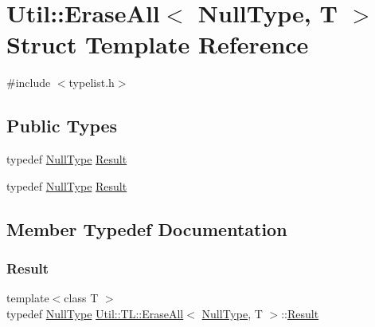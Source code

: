 \hypertarget{structUtil_1_1TL_1_1EraseAll_3_01NullType_00_01T_01_4}{}\section{Util\+:\+:Erase\+All$<$ Null\+Type, T $>$ Struct Template Reference}
\label{structUtil_1_1TL_1_1EraseAll_3_01NullType_00_01T_01_4}


{\ttfamily \#include $<$typelist.\+h$>$}

\subsection*{Public Types}
\begin{DoxyCompactItemize}
\item 
typedef \mbox{\hyperlink{classUtil_1_1NullType}{Null\+Type}} \mbox{\hyperlink{structUtil_1_1TL_1_1EraseAll_3_01NullType_00_01T_01_4_ae8985ba005cb92b28012106353aa56be}{Result}}
\item 
typedef \mbox{\hyperlink{classUtil_1_1NullType}{Null\+Type}} \mbox{\hyperlink{structUtil_1_1TL_1_1EraseAll_3_01NullType_00_01T_01_4_ae8985ba005cb92b28012106353aa56be}{Result}}
\end{DoxyCompactItemize}


\subsection{Member Typedef Documentation}
\mbox{\label{structUtil_1_1TL_1_1EraseAll_3_01NullType_00_01T_01_4_ae8985ba005cb92b28012106353aa56be}} 
\subsubsection{\texorpdfstring{Result}{Result}\hspace{0.1cm}{\footnotesize\ttfamily [1/2]}}
{\footnotesize\ttfamily template$<$class T $>$ \\
typedef \mbox{\hyperlink{classUtil_1_1NullType}{Null\+Type}} \mbox{\hyperlink{structUtil_1_1TL_1_1EraseAll}{Util\+::\+T\+L\+::\+Erase\+All}}$<$ \mbox{\hyperlink{classUtil_1_1NullType}{Null\+Type}}, T $>$\+::\mbox{\hyperlink{structUtil_1_1TL_1_1EraseAll_3_01NullType_00_01T_01_4_ae8985ba005cb92b28012106353aa56be}{Result}}}

